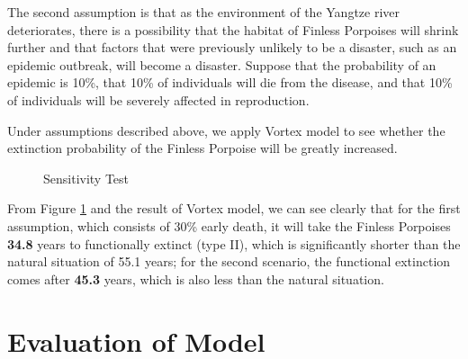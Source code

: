 \documentclass{mcmthesis}
\numberwithin{figure}{section}
\numberwithin{table}{section}
\numberwithin{equation}{section}
\begin{document}
The second assumption is that as the environment of the Yangtze river deteriorates, 
there is a possibility that the habitat of Finless Porpoises will 
shrink further and that factors that were previously unlikely 
to be a disaster, such as an epidemic outbreak, will become a 
disaster. Suppose that the probability of an epidemic is 10\%, 
that 10\% of individuals will die from the disease, and that 
10\% of individuals will be severely affected in reproduction.
\par
Under assumptions described above, we apply Vortex model to see whether the 
extinction probability of the Finless Porpoise will be greatly increased.

\begin{figure}[htbp]
  \centering
  \quad
  \caption{Sensitivity Test}\label{Sensitivity}
\end{figure}

From Figure \ref{Sensitivity} and the result of Vortex model, we can
see clearly that for the first assumption, which consists of 30\%
early death, it will take the Finless Porpoises \textbf{34.8} years to
functionally extinct (type II), which is significantly shorter than the 
natural situation of 55.1 years; for the second scenario, the functional
extinction comes after \textbf{45.3} years, which is also less than the 
natural situation.




\section{Evaluation of Model}
\end{document}
